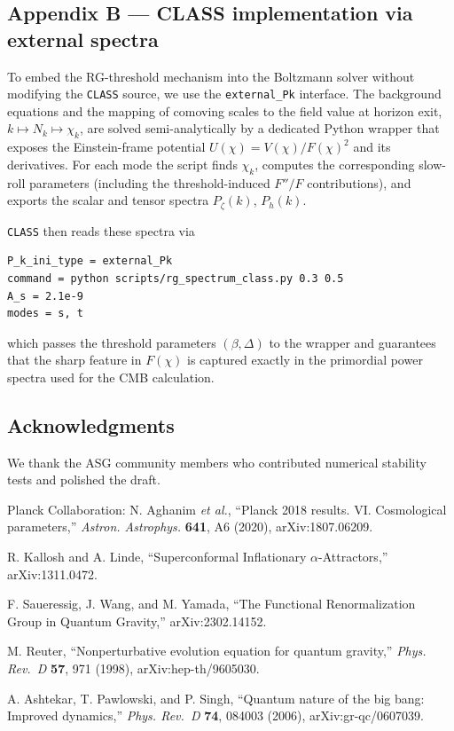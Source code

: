 \documentclass[
]{article}
\begin{document}
\subsection{Appendix B --- CLASS implementation via external
spectra}\label{appendix-b-class-implementation-via-external-spectra}

To embed the RG-threshold mechanism into the Boltzmann solver without
modifying the \texttt{CLASS} source, we use the \texttt{external\_Pk}
interface. The background equations and the mapping of comoving scales
to the field value at horizon exit, \(k \mapsto N_k \mapsto \chi_k\),
are solved semi-analytically by a dedicated Python wrapper that exposes
the Einstein-frame potential \(U(\chi) = V(\chi)/F(\chi)^2\) and its
derivatives. For each mode the script finds \(\chi_k\), computes the
corresponding slow-roll parameters (including the threshold-induced
\(F''/F\) contributions), and exports the scalar and tensor spectra
\(P_\zeta(k)\), \(P_h(k)\).

\texttt{CLASS} then reads these spectra via

\begin{verbatim}
P_k_ini_type = external_Pk
command = python scripts/rg_spectrum_class.py 0.3 0.5
A_s = 2.1e-9
modes = s, t
\end{verbatim}

which passes the threshold parameters \((\beta, \Delta)\) to the wrapper
and guarantees that the sharp feature in \(F(\chi)\) is captured exactly
in the primordial power spectra used for the CMB calculation.

\subsection{Acknowledgments}\label{acknowledgments}

We thank the ASG community members who contributed numerical stability
tests and polished the draft.

Planck Collaboration: N. Aghanim \emph{et al.}, ``Planck 2018 results.
VI. Cosmological parameters,'' \emph{Astron. Astrophys.} \textbf{641},
A6 (2020), arXiv:1807.06209.

R. Kallosh and A. Linde, ``Superconformal Inflationary
\(\alpha\)-Attractors,'' arXiv:1311.0472.

F. Saueressig, J. Wang, and M. Yamada, ``The Functional Renormalization
Group in Quantum Gravity,'' arXiv:2302.14152.

M. Reuter, ``Nonperturbative evolution equation for quantum gravity,''
\emph{Phys. Rev.~D} \textbf{57}, 971 (1998), arXiv:hep-th/9605030.

A. Ashtekar, T. Pawlowski, and P. Singh, ``Quantum nature of the big
bang: Improved dynamics,'' \emph{Phys. Rev.~D} \textbf{74}, 084003
(2006), arXiv:gr-qc/0607039.
\end{document}
